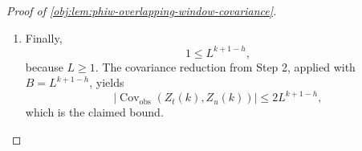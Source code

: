\begin{proof}[Proof of \cref{obj:lem:phiw-overlapping-window-covariance}]
\begin{enumerate}
\item Finally,
\[
1\le L^{k+1-h},
\]
because \(L\ge 1\). The covariance reduction from Step 2, applied with \(B=L^{k+1-h}\), yields
\[
\bigl|\operatorname{Cov}_{\mathrm{obs}}(Z_t(k),Z_u(k))\bigr|
\le
2L^{k+1-h},
\]
which is the claimed bound.
\end{enumerate}
\end{proof}
